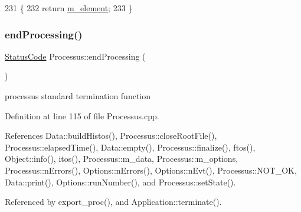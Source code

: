 \begin{DoxyCode}
231                       \{
232     \textcolor{keywordflow}{return} \hyperlink{classProcessus_aa9d24d53c3e52f36786cabb5d8e296e7}{m\_element};
233   \}
\end{DoxyCode}
\mbox{\label{classProcessus_a5e4da662989d356b89d490b89c7afbfd}} 
\subsubsection{\texorpdfstring{end\+Processing()}{endProcessing()}}
{\footnotesize\ttfamily \hyperlink{classStatusCode}{Status\+Code} Processus\+::end\+Processing (\begin{DoxyParamCaption}{ }\end{DoxyParamCaption})\hspace{0.3cm}{\ttfamily [inherited]}}

processus standard termination function 

Definition at line 115 of file Processus.\+cpp.



References Data\+::build\+Histos(), Processus\+::close\+Root\+File(), Processus\+::elapsed\+Time(), Data\+::empty(), Processus\+::finalize(), ftos(), Object\+::info(), itos(), Processus\+::m\+\_\+data, Processus\+::m\+\_\+options, Processus\+::n\+Errors(), Options\+::n\+Errors(), Options\+::n\+Evt(), Processus\+::\+N\+O\+T\+\_\+\+OK, Data\+::print(), Options\+::run\+Number(), and Processus\+::set\+State().



Referenced by export\+\_\+proc(), and Application\+::terminate().


